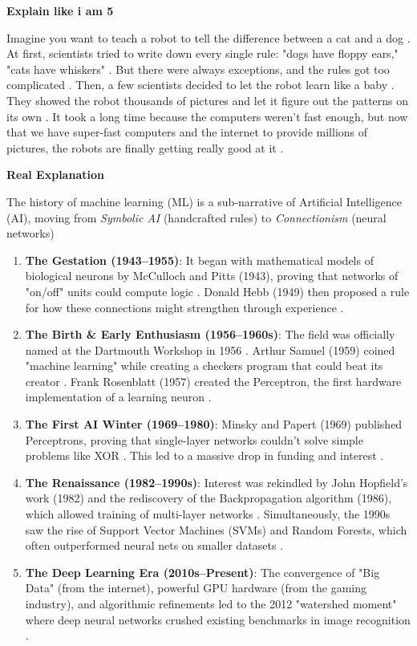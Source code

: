 \documentclass{report}
\newcommand{\eliFive}[1]{
	\begin{center}
		{\bfseries \textcolor{tnPurple}{Explain like i am 5}}
	\end{center}
	
	\vspace{6pt}
	
	{\color{tnPurple}
		#1
	}
	
	\vspace{12pt}}
\newcommand{\re}[1]{
	\begin{center}
		{\bfseries \textcolor{tnOrange}{Real Explanation}}
	\end{center}
	
	\vspace{6pt}
	
	{\color{tnOrange}
		#1
	}
	
	\vspace{12pt}}
\begin{document}
\eliFive{Imagine you want to teach a robot to tell the difference between a cat and a dog
	. At first, scientists tried to write down every single rule: "dogs have floppy ears," "cats have whiskers"
	. But there were always exceptions, and the rules got too complicated
	. Then, a few scientists decided to let the robot learn like a baby
	. They showed the robot thousands of pictures and let it figure out the patterns on its own
	. It took a long time because the computers weren't fast enough, but now that we have super-fast computers and the internet to provide millions of pictures, the robots are finally getting really good at it
	.}


\re{The history of machine learning (ML) is a sub-narrative of Artificial Intelligence (AI), moving from \textit{Symbolic AI} (handcrafted rules) to \textit{Connectionism} (neural networks)
	\begin{enumerate}
		\item \textbf{The Gestation (1943–1955)}: It began with mathematical models of biological neurons by McCulloch and Pitts (1943), proving that networks of "on/off" units could compute logic
		. Donald Hebb (1949) then proposed a rule for how these connections might strengthen through experience
		.
		\item \textbf{The Birth & Early Enthusiasm (1956–1960s)}: The field was officially named at the Dartmouth Workshop in 1956
		. Arthur Samuel (1959) coined "machine learning" while creating a checkers program that could beat its creator
		. Frank Rosenblatt (1957) created the Perceptron, the first hardware implementation of a learning neuron
		.
		\item \textbf{The First AI Winter (1969–1980)}: Minsky and Papert (1969) published Perceptrons, proving that single-layer networks couldn't solve simple problems like XOR
		. This led to a massive drop in funding and interest
		.
		\item \textbf{The Renaissance (1982–1990s)}: Interest was rekindled by John Hopfield's work (1982) and the rediscovery of the Backpropagation algorithm (1986), which allowed training of multi-layer networks
		. Simultaneously, the 1990s saw the rise of Support Vector Machines (SVMs) and Random Forests, which often outperformed neural nets on smaller datasets
		.
		\item \textbf{The Deep Learning Era (2010s–Present)}: The convergence of "Big Data" (from the internet), powerful GPU hardware (from the gaming industry), and algorithmic refinements led to the 2012 "watershed moment" where deep neural networks crushed existing benchmarks in image recognition
		.
	\end{enumerate}}
\end{document}
